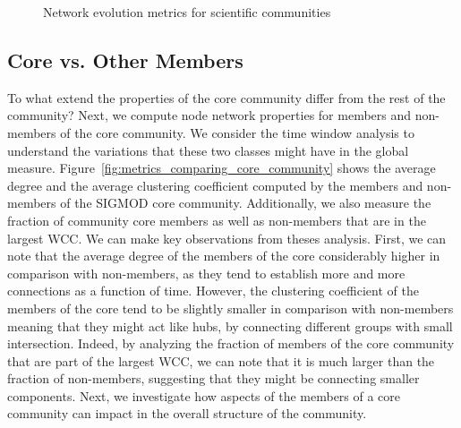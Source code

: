 \begin{figure}[!htb]
\begin{center}
{  }%
  \end{center}
  \caption{Network evolution metrics for scientific communities}
  \label{fig:metrics}
\end{figure}



\subsection{Core vs. Other Members}
\label{sub:vs}

To what extend the properties of the core community differ from the rest of the community?  Next, we compute node network properties for members and non-members of the core
community. We consider the time window analysis to understand the variations that these two classes might have in the global measure.
Figure~\ref{fig:metrics_comparing_core_community} shows the average degree and the average clustering coefficient computed by the members and non-members of the SIGMOD core
community. Additionally, we also measure the fraction of community core members as well as non-members that are in the largest WCC. We can make key observations
from theses analysis. First, we can note that the average degree of the members of the core considerably higher in comparison with non-members, as they tend to establish more and
more connections as a function of time. However, the clustering coefficient of the members of the core tend to be slightly smaller in comparison with non-members meaning that they
might act like hubs, by connecting different groups with small intersection. Indeed, by analyzing the fraction of members of the core community that are part of the largest
WCC, we can note that it is much larger than the fraction of non-members, suggesting that they might be connecting smaller components. Next, we investigate how
aspects of the members of a core community can impact in the overall structure of the community.


